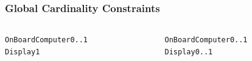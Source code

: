 \documentclass[table,15pt,t]{beamer}
\newcounter{i}
\begin{document}
\begin{frame}[fragile]
  \frametitle{Global Cardinality Constraints}
  \begin{columns}
    \begin{column}{0.5\textwidth}
      \begin{alltt}
        \begin{small}
\textsf{OnBoardComputer} 0..1
  \textsf{Display} 1
        \end{small}
      \end{alltt}
    \end{column}
\pause
    \begin{column}{0.5\textwidth}
      \begin{alltt}
        \begin{small}
\textsf{OnBoardComputer} 0..1
  \textsf{Display} 0..1
        \end{small}
      \end{alltt}
    \end{column}
  \end{columns}

\end{frame}
\end{document}
